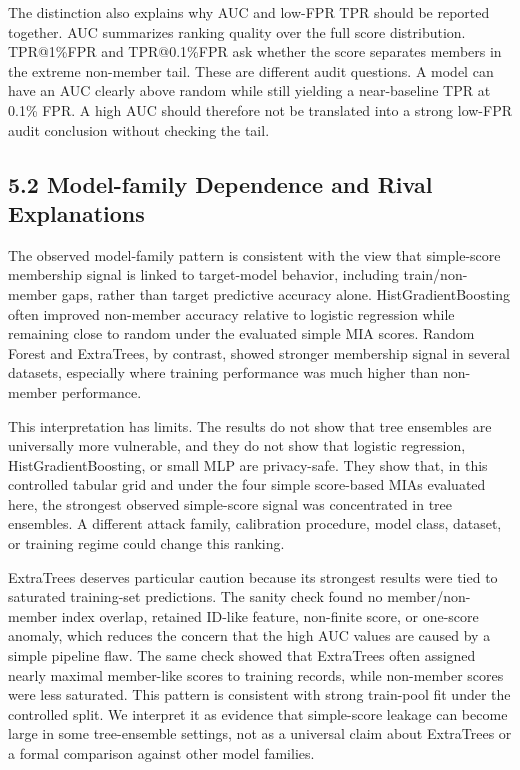 \documentclass[
  10pt,
  twocolumn]{article}
\begin{document}
The distinction also explains why AUC and low-FPR TPR should be reported together. AUC summarizes ranking quality over the full score distribution. TPR@1\%FPR and TPR@0.1\%FPR ask whether the score separates members in the extreme non-member tail. These are different audit questions. A model can have an AUC clearly above random while still yielding a near-baseline TPR at 0.1\% FPR. A high AUC should therefore not be translated into a strong low-FPR audit conclusion without checking the tail.

\hypertarget{model-family-dependence-and-rival-explanations}{%
\subsection{5.2 Model-family Dependence and Rival Explanations}\label{model-family-dependence-and-rival-explanations}}

The observed model-family pattern is consistent with the view that simple-score membership signal is linked to target-model behavior, including train/non-member gaps, rather than target predictive accuracy alone. HistGradientBoosting often improved non-member accuracy relative to logistic regression while remaining close to random under the evaluated simple MIA scores. Random Forest and ExtraTrees, by contrast, showed stronger membership signal in several datasets, especially where training performance was much higher than non-member performance.

This interpretation has limits. The results do not show that tree ensembles are universally more vulnerable, and they do not show that logistic regression, HistGradientBoosting, or small MLP are privacy-safe. They show that, in this controlled tabular grid and under the four simple score-based MIAs evaluated here, the strongest observed simple-score signal was concentrated in tree ensembles. A different attack family, calibration procedure, model class, dataset, or training regime could change this ranking.

ExtraTrees deserves particular caution because its strongest results were tied to saturated training-set predictions. The sanity check found no member/non-member index overlap, retained ID-like feature, non-finite score, or one-score anomaly, which reduces the concern that the high AUC values are caused by a simple pipeline flaw. The same check showed that ExtraTrees often assigned nearly maximal member-like scores to training records, while non-member scores were less saturated. This pattern is consistent with strong train-pool fit under the controlled split. We interpret it as evidence that simple-score leakage can become large in some tree-ensemble settings, not as a universal claim about ExtraTrees or a formal comparison against other model families.
\end{document}
